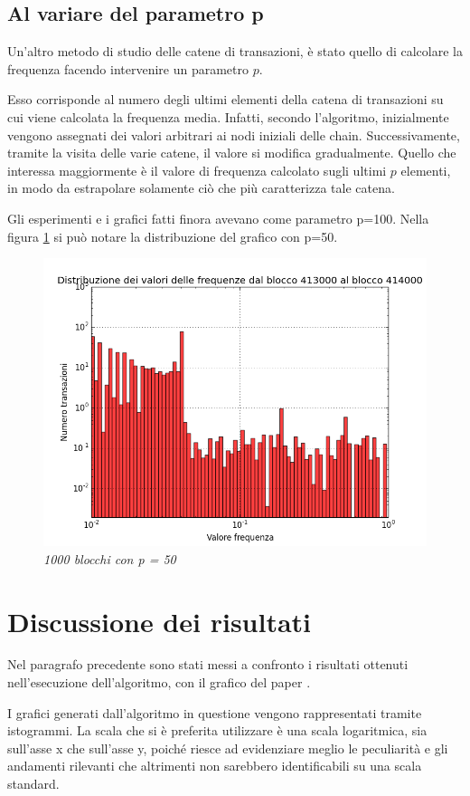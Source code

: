 \subsection{Al variare del parametro p}

Un'altro metodo di studio delle catene di transazioni, è stato quello di calcolare la frequenza facendo intervenire un parametro $p$.

Esso corrisponde al numero degli ultimi elementi della catena di transazioni su cui viene calcolata la frequenza media. Infatti, secondo l'algoritmo, inizialmente vengono assegnati dei valori arbitrari ai nodi iniziali delle chain. Successivamente, tramite la visita delle varie catene, il valore si modifica gradualmente. Quello che interessa maggiormente è il valore di frequenza calcolato sugli ultimi $p$ elementi, in modo da estrapolare solamente ciò che più caratterizza tale catena.

Gli esperimenti e i grafici fatti finora avevano come parametro p=100. Nella figura \ref{fig:p50} si può notare la distribuzione del grafico con p=50.

\begin{figure}[htbp]
	\centering
	\includegraphics[width=0.8 \textwidth]{figure/p50}
	\caption{\textit{1000 blocchi con p = 50}\label{fig:p50}}
\end{figure}

\section{Discussione dei risultati}
Nel paragrafo precedente sono stati messi a confronto i risultati ottenuti nell'esecuzione dell'algoritmo, con il grafico del paper \cite{ddp-ltcbh-17}. 

I grafici generati dall'algoritmo in questione vengono rappresentati tramite istogrammi. La scala che si è preferita utilizzare è una scala logaritmica, sia sull'asse x che sull'asse y, poiché riesce ad evidenziare meglio le peculiarità e gli andamenti rilevanti che altrimenti non sarebbero identificabili su una scala standard.

